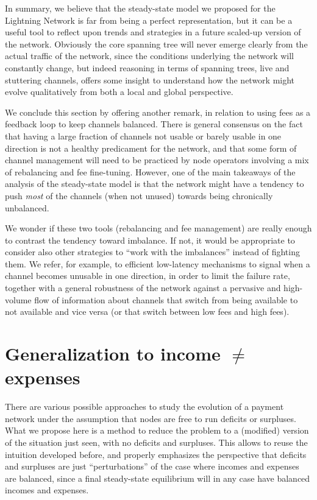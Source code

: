 \documentclass[a4paper]{article}
\begin{document}
In summary, we believe that the steady-state model we proposed for the Lightning Network is far from being a perfect representation, but it can be a useful tool to reflect upon trends and strategies in a future scaled-up version of the network. Obviously the core spanning tree will never emerge clearly from the actual traffic of the network, since the conditions underlying the network will constantly change, but indeed reasoning in terms of spanning trees, live and stuttering channels, offers some insight to understand how the network might evolve qualitatively from both a local and global perspective.

We conclude this section by offering another remark, in relation to using fees as a feedback loop to keep channels balanced. There is general consensus on the fact that having a large fraction of channels not usable or barely usable in one direction is not a healthy predicament for the network, and that some form of channel management will need to be practiced by node operators involving a mix of rebalancing and fee fine-tuning. However, one of the main takeaways of the analysis of the steady-state model is that the network might have a tendency to push \emph{most} of the channels (when not unused) towards being chronically unbalanced.

We wonder if these two tools (rebalancing and fee management) are really enough to contrast the tendency toward imbalance. If not, it would be appropriate to consider also other strategies to ``work with the imbalances'' instead of fighting them. We refer, for example, to efficient low-latency mechanisms to signal when a channel becomes unusable in one direction, in order to limit the failure rate, together with a general robustness of the network against a pervasive and high-volume flow of information about channels that switch from being available to not available and vice versa (or that switch between low fees and high fees).

\section{Generalization to income $\neq$ expenses}\label{sec_generalization}

There are various possible approaches to study the evolution of a payment network under the assumption that nodes are free to run deficits or surpluses. What we propose here is a method to reduce the problem to a (modified) version of the situation just seen, with no deficits and surpluses. This allows to reuse the intuition developed before, and properly emphasizes the perspective that deficits and surpluses are just ``perturbations'' of the case where incomes and expenses are balanced, since a final steady-state equilibrium will in any case have balanced incomes and expenses.
\end{document}
